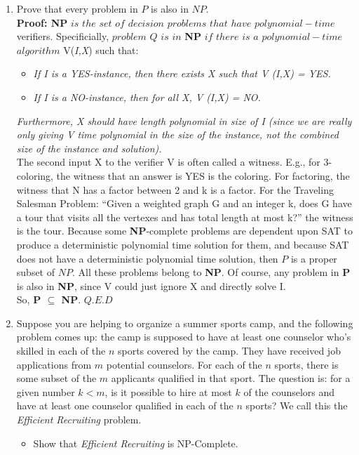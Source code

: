\documentclass[12pt]{article}
\begin{document}
\begin{enumerate}
\pagebreak
\item  Prove that every problem in $P$ is also in $NP$.\\
\textbf{Proof: NP} $is$ $the$ $set$ $of$ $decision$ $problems$ $that$ $have$ $polynomial-time$ verifiers. Specificially, $problem$ $Q$ $is$ $in$ \textbf{NP} $if$ $there$ $is$ $a$ $polynomial-time$ $algorithm $ V(\textit{I,X}) such that:
\begin{itemize}
\item \textit{If I is a YES-instance, then there exists X such that V (I,X) = YES.}
\item \textit{If I is a NO-instance, then for all X, V (I,X) = NO.}
\end{itemize}
\textit{Furthermore, X should have length polynomial in size of I (since we are really only giving V time polynomial in the size of the instance, not the combined size of the instance and solution).} \\
The second input X to the verifier V is often called a witness. E.g., for 3-coloring, the witness that an answer is YES is the coloring. For factoring, the witness that N has a factor between 2 and k is a factor. For the Traveling Salesman Problem: “Given a weighted graph G and an integer k, does G have a tour that visits all the vertexes and has total length at most k?” the witness is the tour. Because some \textbf{NP}-complete problems are dependent upon SAT to produce a deterministic polynomial time solution for them, and because SAT does not have a deterministic polynomial time solution, then $P$ is a proper subset of $NP.$ All these problems belong to \textbf{NP}. Of course, any problem in \textbf{P} is also in \textbf{NP}, since V could just ignore X and directly solve I.\\
So, \textbf{P $\subseteq$ NP}. \hfill $ Q.E.D $
\pagebreak
\item Suppose you are helping to organize a summer sports camp, and the following problem comes up: the camp is supposed to have at least one counselor who’s skilled in each of the $n$ sports covered by the camp. They have received job applications from $m$ potential counselors. For each of the $n$ sports, there is some subset of the $m$ applicants qualified in that sport. The question is: for a given number $k < m$, is it possible to hire at most $k$ of the counselors and have at least one counselor qualified in each of the $n$ sports? We call this the \textit{Efficient Recruiting} problem.
\begin{itemize}
\item Show that \textit{Efficient Recruiting} is NP-Complete.

\end{itemize}
\end{enumerate}
\end{document}
